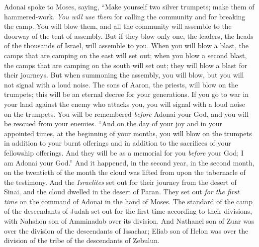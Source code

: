\begin{biblechapter} %
 Adonai spoke to Moses, saying,
\verse “Make yourself two silver trumpets; make them of hammered-work. \textit{You will use them} for calling the community and for breaking the camp.
\verse You will blow them, and all the community will assemble to the doorway of the tent of assembly.
\verse But if they blow only one, the leaders, the heads of the thousands of Israel, will assemble to you.
\verse When you will blow a blast, the camps that are camping on the east will set out;
\verse when you blow a second blast, the camps that are camping on the south will set out; they will blow a blast for their journeys.
\verse But when summoning the assembly, you will blow, but you will not signal with a loud noise.
\verse The sons of Aaron, the priests, will blow on the trumpets; this will be an eternal decree for your generations.
\verse If you go to war in your land against the enemy who attacks you, you will signal with a loud noise on the trumpets. You will be remembered \textit{before} Adonai your God, and you will be rescued from your enemies.
\verse “And on the day of your joy and in your appointed times, at the beginning of your months, you will blow on the trumpets in addition to your burnt offerings and in addition to the sacrifices of your fellowship offerings. And they will be as a memorial for you \textit{before} your God; I am Adonai your God.”
 And it happened, in the second year, in the second month, on the twentieth of the month the cloud was lifted from upon the tabernacle of the testimony.
\verse And the \textit{Israelites} set out for their journey from the desert of Sinai, and the cloud dwelled in the desert of Paran.
\verse They set out \textit{for the first time} on the command of Adonai in the hand of Moses.
\verse The standard of the camp of the descendants of Judah set out for the first time according to their divisions, with Nahshon son of Amminadab over its division.
\verse And Nathanel son of Zuar was over the division of the descendants of Issachar;
\verse Eliab son of Helon was over the division of the tribe of the descendants of Zebulun.

\end{biblechapter}
